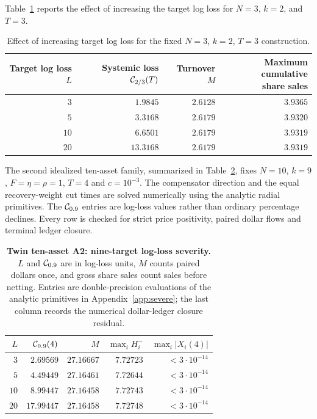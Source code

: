\documentclass[review,hidelinks,onefignum,onetabnum]{siamonline250211}
\begin{document}
Table~\ref{tab:target-loss} reports the effect of increasing the target log loss for $N=3$, $k=2$, and $T=3$.
\begin{table}[H]\centering\small
\caption{Effect of increasing target log loss for the fixed $N=3$, $k=2$, $T=3$ construction.}\label{tab:target-loss}
\begin{tabular}{@{}rrrr@{}}\toprule
Target log loss $L$ & Systemic loss $\mathcal{C}_{2/3}(T)$ & Turnover $M$ & \shortstack{Maximum cumulative\\share sales}\\\midrule
$3$ & $1.9845$ & $2.6128$ & $3.9365$\\
 $5$ & $3.3168$ & $2.6179$ & $3.9320$\\
$10$ & $6.6501$ & $2.6179$ & $3.9319$\\
$20$ & $13.3168$ & $2.6179$ & $3.9319$\\
\bottomrule\end{tabular}
\end{table}
The second idealized ten-asset family, summarized in
Table~\ref{tab:twin-severe}, fixes $N=10$, $k=9$,
$F=\eta=\rho=1$, $T=4$ and $c=10^{-3}$.
The compensator direction and the equal recovery-weight
cut times are solved numerically using the analytic
radial primitives. The $\mathcal{C}_{0.9}$ entries
are log-loss values rather than ordinary percentage
declines. Every row is checked for strict price
positivity, paired dollar flows and terminal ledger closure.

\begin{table}[H]\centering\small
\caption{\textbf{Twin ten-asset A2: nine-target log-loss
severity.} $L$ and $\mathcal{C}_{0.9}$ are in log-loss units,
$M$ counts paired dollars once, and gross share sales
count sales before netting. Entries are double-precision
evaluations of the analytic primitives in Appendix~\ref{app:severe};
the last column records the numerical dollar-ledger closure residual.}
\label{tab:twin-severe}
\begin{tabular}{@{}rrrrr@{}}\toprule
$L$ & $\mathcal{C}_{0.9}(4)$ & $M$ &
$\max_i H_i^-$ & $\max_i|X_i(4)|$\\\midrule
$3$ & $2.69569$ & $27.16667$ & $7.72723$ & $<3\cdot10^{-14}$\\
$5$ & $4.49449$ & $27.16461$ & $7.72644$ & $<3\cdot10^{-14}$\\
$10$ & $8.99447$ & $27.16458$ & $7.72743$ & $<3\cdot10^{-14}$\\
$20$ & $17.99447$ & $27.16458$ & $7.72748$ & $<3\cdot10^{-14}$\\
\bottomrule\end{tabular}
\end{table}
\end{document}
